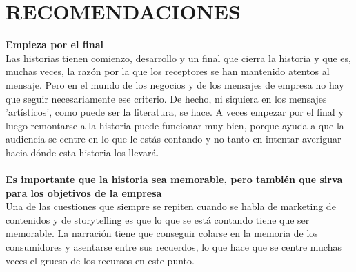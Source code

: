\documentclass[twoside,twocolumn]{article}
\begin{document}
\section{RECOMENDACIONES}

\textbf{Empieza por el final}
\\Las historias tienen comienzo, desarrollo y un final que cierra la historia y que es, muchas veces, la razón por la que los receptores se han mantenido atentos al mensaje. Pero en el mundo de los negocios y de los mensajes de empresa no hay que seguir necesariamente ese criterio. De hecho, ni siquiera en los mensajes 'artísticos', como puede ser la literatura, se hace. A veces empezar por el final y luego remontarse a la historia puede funcionar muy bien, porque ayuda a que la audiencia se centre en lo que le estás contando y no tanto en intentar averiguar hacia dónde esta historia los llevará.
\\\\
\textbf{Es importante que la historia sea memorable, pero también que sirva para los objetivos de la empresa}
\\
Una de las cuestiones que siempre se repiten cuando se habla de marketing de contenidos y de storytelling es que lo que se está contando tiene que ser memorable. La narración tiene que conseguir colarse en la memoria de los consumidores y asentarse entre sus recuerdos, lo que hace que se centre muchas veces el grueso de los recursos en este punto.
\end{document}
